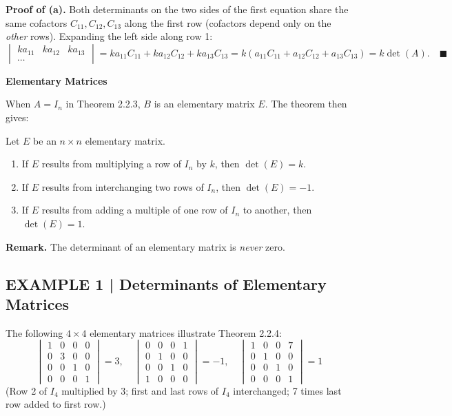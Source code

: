 \documentclass{article}
\newcommand{\redheading}[1]{{\vspace{2mm}\noindent\Large\bfseries\color{red!55!black} #1\par}\vspace{2mm}}
\theoremstyle{mystyle}
\begin{document}
\vspace{2mm}
\textbf{Proof of (a).} Both determinants on the two sides of the first equation share the same cofactors $C_{11},C_{12},C_{13}$ along the first row (cofactors depend only on the \emph{other} rows). Expanding the left side along row 1:
\[
\begin{vmatrix}ka_{11}&ka_{12}&ka_{13}\\\cdots\end{vmatrix}
=ka_{11}C_{11}+ka_{12}C_{12}+ka_{13}C_{13}
=k(a_{11}C_{11}+a_{12}C_{12}+a_{13}C_{13})
=k\det(A).\quad\blacksquare
\]

\redheading{Elementary Matrices}

When $A=I_n$ in Theorem 2.2.3, $B$ is an elementary matrix $E$. The theorem then gives:

\begin{tcolorbox}[colback=red!4, colframe=red!60!black,
  title={\textbf{Theorem 2.2.4}}, boxrule=0.5mm, arc=3mm]
Let $E$ be an $n\times n$ elementary matrix.
\begin{enumerate}
  \item[(a)] If $E$ results from multiplying a row of $I_n$ by $k$, then $\det(E)=k$.
  \item[(b)] If $E$ results from interchanging two rows of $I_n$, then $\det(E)=-1$.
  \item[(c)] If $E$ results from adding a multiple of one row of $I_n$ to another, then $\det(E)=1$.
\end{enumerate}
\end{tcolorbox}

\textbf{Remark.} The determinant of an elementary matrix is \emph{never} zero.

\subsection*{EXAMPLE 1 | Determinants of Elementary Matrices}

The following $4\times4$ elementary matrices illustrate Theorem 2.2.4:
\[
\begin{vmatrix}1&0&0&0\\0&3&0&0\\0&0&1&0\\0&0&0&1\end{vmatrix}=3,\quad
\begin{vmatrix}0&0&0&1\\0&1&0&0\\0&0&1&0\\1&0&0&0\end{vmatrix}=-1,\quad
\begin{vmatrix}1&0&0&7\\0&1&0&0\\0&0&1&0\\0&0&0&1\end{vmatrix}=1
\]
(Row 2 of $I_4$ multiplied by 3; first and last rows of $I_4$ interchanged; 7 times last row added to first row.)
\end{document}
